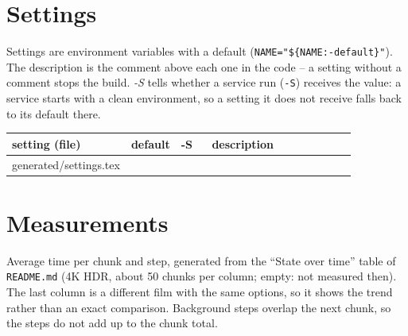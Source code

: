 \documentclass[11pt,a4paper]{article}
\makeatletter
\newcommand{\tablerows}[1]{\@@input #1 }
\makeatother
\begin{document}
\section{Settings}\label{sec:settings}

Settings are environment variables with a default (\texttt{NAME="\$\{NAME:-default\}"}). The
description is the comment above each one in the code -- a setting without a comment stops the
build. \emph{-S} tells whether a service run (\texttt{-S}) receives the value: a service starts with
a clean environment, so a setting it does not receive falls back to its default there.

\begin{small}
\begin{longtable}{@{}>{\raggedright}p{0.3\linewidth} >{\raggedright}p{0.14\linewidth} l p{0.42\linewidth}@{}}
\toprule
\textbf{setting} (file) & \textbf{default} & \textbf{-S} & \textbf{description} \\
\midrule
\endhead
\tablerows{generated/settings.tex}
\bottomrule
\end{longtable}
\end{small}

\section{Measurements}\label{sec:measurements}

Average time per chunk and step, generated from the ``State over time'' table of
\texttt{README.md} (4K HDR, about 50 chunks per column; empty: not measured then). The last column is
a different film with the same options, so it shows the trend rather than an exact comparison.
Background steps overlap the next chunk, so the steps do not add up to the chunk total.
\end{document}
